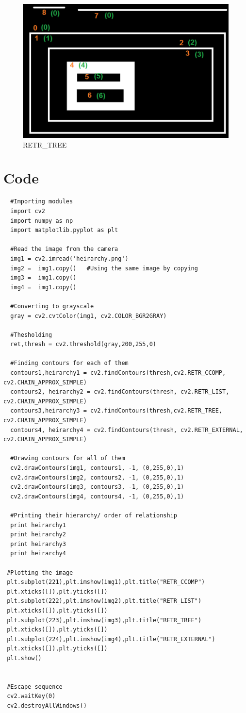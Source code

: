 \documentclass[]{article}
\begin{document}
\begin{figure}[htbp]
\centering
\includegraphics{tree_hierarchy.png}
\caption{RETR\_TREE}
\end{figure}

\section{Code}\label{code}

\begin{verbatim}
  #Importing modules
  import cv2
  import numpy as np
  import matplotlib.pyplot as plt

  #Read the image from the camera
  img1 = cv2.imread('heirarchy.png')
  img2 =  img1.copy()   #Using the same image by copying
  img3 =  img1.copy()
  img4 =  img1.copy()

  #Converting to grayscale
  gray = cv2.cvtColor(img1, cv2.COLOR_BGR2GRAY)

  #Thesholding
  ret,thresh = cv2.threshold(gray,200,255,0)

  #Finding contours for each of them
  contours1,heirarchy1 = cv2.findContours(thresh,cv2.RETR_CCOMP, cv2.CHAIN_APPROX_SIMPLE)
  contours2, heirarchy2 = cv2.findContours(thresh, cv2.RETR_LIST, cv2.CHAIN_APPROX_SIMPLE)
  contours3,heirarchy3 = cv2.findContours(thresh,cv2.RETR_TREE, cv2.CHAIN_APPROX_SIMPLE)
  contours4, heirarchy4 = cv2.findContours(thresh, cv2.RETR_EXTERNAL, cv2.CHAIN_APPROX_SIMPLE)

  #Drawing contours for all of them
  cv2.drawContours(img1, contours1, -1, (0,255,0),1)
  cv2.drawContours(img2, contours2, -1, (0,255,0),1)
  cv2.drawContours(img3, contours3, -1, (0,255,0),1)
  cv2.drawContours(img4, contours4, -1, (0,255,0),1)

  #Printing their hierarchy/ order of relationship
  print heirarchy1
  print heirarchy2
  print heirarchy3
  print heirarchy4

 #Plotting the image 
 plt.subplot(221),plt.imshow(img1),plt.title("RETR_CCOMP")
 plt.xticks([]),plt.yticks([])
 plt.subplot(222),plt.imshow(img2),plt.title("RETR_LIST")
 plt.xticks([]),plt.yticks([])
 plt.subplot(223),plt.imshow(img3),plt.title("RETR_TREE")
 plt.xticks([]),plt.yticks([])
 plt.subplot(224),plt.imshow(img4),plt.title("RETR_EXTERNAL")
 plt.xticks([]),plt.yticks([])
 plt.show()


 #Escape sequence
 cv2.waitKey(0)
 cv2.destroyAllWindows()
\end{verbatim}
\end{document}
